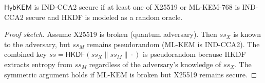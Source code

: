 \begin{theorem}
\label{thm:hybrid-kem}
$\textsf{HybKEM}$ is IND-CCA2 secure if at least one of X25519 or ML-KEM-768 is
IND-CCA2 secure and HKDF is modeled as a random oracle.
\end{theorem}

\begin{proof}[Proof sketch]
Assume X25519 is broken (quantum adversary). Then $ss_X$ is known to the adversary,
but $ss_M$ remains pseudorandom (ML-KEM is IND-CCA2). The combined key
$ss = \textsf{HKDF}(ss_X \| ss_M \| \cdot)$ is pseudorandom because HKDF extracts
entropy from $ss_M$ regardless of the adversary's knowledge of $ss_X$. The symmetric
argument holds if ML-KEM is broken but X25519 remains secure.
\end{proof}

